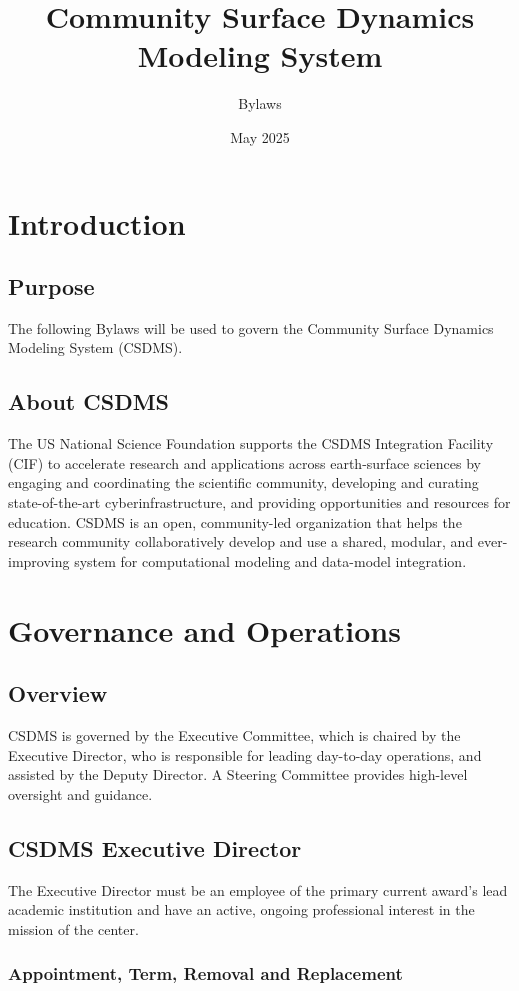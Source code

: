 \documentclass[11pt, oneside]{article}   	%
\title{Community Surface Dynamics Modeling System}
\author{Bylaws}
\date{May 2025}							%
\def\article#1{
\renewcommand{\thesection}{Article \Roman{section}} 
\section[Article]{#1}
\renewcommand{\thesection}{\Roman{section}} 
}
\begin{document}
\maketitle



\article{Introduction}

\subsection{Purpose}

The following Bylaws will be used to govern the Community Surface Dynamics Modeling System (CSDMS). 

\subsection{About CSDMS}

The US National Science Foundation supports the CSDMS Integration Facility (CIF) to accelerate research and applications across earth-surface sciences by engaging and coordinating the scientific community, developing and curating state-of-the-art cyberinfrastructure, and providing opportunities and resources for education. CSDMS is an open, community-led organization that helps the research community collaboratively develop and use a shared, modular, and ever-improving system for computational modeling and data-model integration.


\article{Governance and Operations}

\subsection{Overview}

CSDMS is governed by the Executive Committee, which is chaired by the Executive Director, who is responsible for leading day-to-day operations, and assisted by the Deputy Director. A Steering Committee provides high-level oversight and guidance.


\subsection{CSDMS Executive Director}

The Executive Director must be an employee of the primary current award's lead academic institution and have an active, ongoing professional interest in the mission of the center. 

\subsubsection{Appointment, Term, Removal and Replacement}
\end{document}
